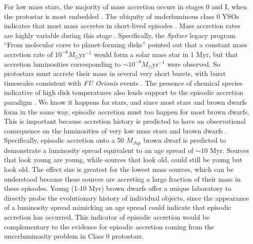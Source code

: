For low mass stars, the majority of mass accretion occurs in stages 0 and I, when the protostar is most embedded \citep{2007ARA&A..45..565M,2014prpl.conf..195D}.  The ubiquity of underluminous class 0 YSOs indicates that most mass accretes in short-lived episodes \citep{2008ApJS..179..249D}.  Mass accretion rates are highly variable during this stage \citep{2006ApJ...650..956V,2009ApJ...702L..27B,2014prpl.conf..387A}.  Specifically, the \emph{Spitzer} legacy program ``From molecular cores to planet-forming disks'' \citep[][\emph{c2d}]{2009ApJS..181..321E} pointed out that a constant mass accretion rate of $10^{-6} M_{\odot}\mathrm{yr}^{-1}$ would form a solar mass star in 1 Myr, but that accretion luminosities corresponding to $\sim10^{-8} M_{\odot}\mathrm{yr}^{-1}$ were observed.  So protostars must accrete their mass in several very short bursts, with burst timescales consistent with \emph{FU Orionis} events \citep{2014prpl.conf..195D}.  The presence of chemical species indicative of high disk temperatures also lends support to the episodic accretion paradigm \citep{2012ApJ...754L..18V}.  We know it happens for stars, and since most stars and brown dwarfs form in the same way, episodic accretion must too happen for most brown dwarfs.  This is important because accretion history is predicted to have an observational consequence on the luminosities of very low mass stars and brown dwarfs \citep{2009ApJ...702L..27B,2011ApJ...730...32S}.  Specifically, episodic accretion onto a 50 $M_{Jup}$ brown dwarf is predicted to demonstrate a luminosity spread equivalent to an age spread of $\sim10$ Myr.  Sources that look young are young, while sources that look old, could still be young but look old.  The effect size is greatest for the lowest mass sources, which can be understood because these sources are accreting a large fraction of their mass in these episodes.  Young (1-10 Myr) brown dwarfs offer a unique laboratory to directly probe the evolutionary history of individual objects, since the appearance of a luminosity spread mimicking an age spread could indicate that episodic accretion has occurred.  This indicator of episodic accretion would be complementary to the evidence for episodic accretion coming from the uncerluminosity problem in Class 0 protostars.


